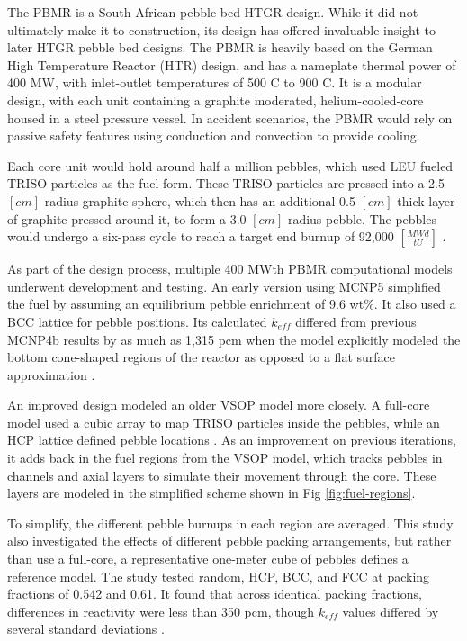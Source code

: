 The PBMR is a South African pebble bed HTGR design.  While it did not ultimately make it to construction, its design has offered invaluable insight to later HTGR pebble bed designs.  The PBMR is heavily based on the German High Temperature Reactor (HTR) design, and has a nameplate thermal power of 400 MW, with inlet-outlet temperatures of 500 \textdegree C to 900 \textdegree C.  It is a modular design, with each unit containing a graphite moderated, helium-cooled-core housed in a steel pressure vessel.  In accident scenarios, the PBMR would rely on passive safety features using conduction and convection to provide cooling.

Each core unit would hold around half a million pebbles, which used LEU fueled TRISO particles as the fuel form.  These TRISO particles are pressed into a 2.5 $\left[cm\right]$ radius graphite sphere, which then has an additional 0.5 $\left[cm\right]$ thick layer of graphite pressed around it, to form a 3.0 $\left[cm\right]$ radius pebble.  The pebbles would undergo a six-pass cycle to reach a target end burnup of 92,000 $\left[\frac{MWd}{tU}\right]$ \cite{venter_pbmr_2005}.

As part of the design process, multiple 400 MWth PBMR computational models underwent development and testing.  An early version using MCNP5 simplified the fuel by assuming an equilibrium pebble enrichment of 9.6 wt\%.  It also used a BCC lattice for pebble positions.  Its calculated $k_{eff}$ differed from previous MCNP4b results by as much as 1,315 pcm when the model explicitly modeled the bottom cone-shaped regions of the reactor as opposed to a flat surface approximation \cite{kim_monte_nodate}.

An improved design modeled an older VSOP model more closely.  A full-core model used a cubic array to map TRISO particles inside the pebbles, while an HCP lattice defined pebble locations \cite{albornoz_mcnp_nodate}.  As an improvement on previous iterations, it adds back in the fuel regions from the VSOP model, which tracks pebbles in channels and axial layers to simulate their movement through the core.  These layers are modeled in the simplified scheme shown in Fig \ref{fig:fuel-regions}.



To simplify, the different pebble burnups in each region are averaged.  This study also investigated the effects of different pebble packing arrangements, but rather than use a full-core, a representative one-meter cube of pebbles defines a reference model.  The study tested random, HCP, BCC, and FCC at packing fractions of 0.542 and 0.61.  It found that across identical packing fractions, differences in reactivity were less than 350 pcm, though $k_{eff}$ values differed by several standard deviations \cite{albornoz_mcnp_nodate}.


